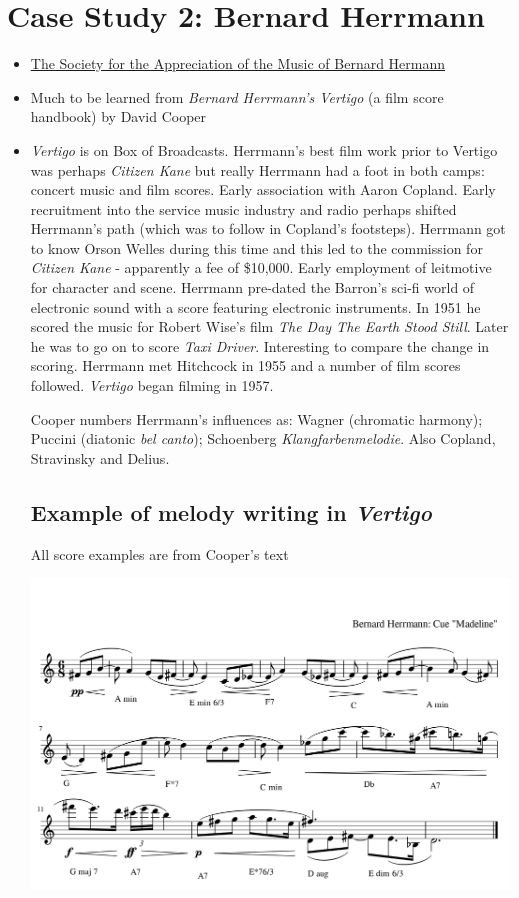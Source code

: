 \section{Case Study 2: Bernard Herrmann}
\begin{itemize}
\item \href{http://www.bernardherrmann.org/}
{The Society for the Appreciation of the Music of Bernard Hermann}
\item Much to be learned from \textit{Bernard Herrmann's Vertigo} (a film score handbook) by David Cooper \citep{cooper2001bernard}
\item \textit{Vertigo} is on Box of Broadcasts. 
Herrmann's best film work prior to Vertigo was perhaps \textit{Citizen Kane} but really Herrmann had a foot in both camps: concert music and film scores.  Early association with Aaron Copland. Early recruitment into the service music industry and radio perhaps shifted Herrmann's path (which was to follow in Copland's footsteps). Herrmann got to know Orson Welles during this time and this led to the commission for \textit{Citizen Kane} - apparently a fee of \$10,000. Early employment of leitmotive for character and scene. Herrmann pre-dated the Barron's sci-fi world of electronic sound with a score featuring electronic instruments. In 1951 he scored the music for Robert Wise's film \textit{The Day The Earth Stood Still}. Later he was to go on to score \textit{Taxi Driver}. Interesting to compare the change in scoring. Herrmann met Hitchcock in 1955 and a number of film scores followed. \textit{Vertigo} began filming in 1957.

Cooper \citeyearpar{cooper2001bernard} numbers Herrmann's influences as: Wagner (chromatic harmony); Puccini (diatonic \textit{bel canto}); Schoenberg \textit{Klangfarbenmelodie}. Also Copland, Stravinsky and Delius. 

\subsection{Example of melody writing in \textit{Vertigo}}

All score examples are from Cooper's text \citeyearpar{cooper2001bernard}

\includegraphics[scale=0.8]{herrmann-madeline} 


\end{itemize}
